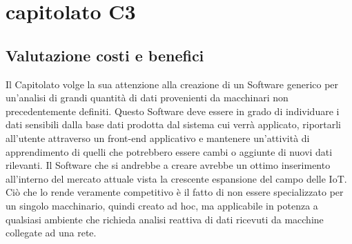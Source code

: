 \section{capitolato C3}

\subsection{Valutazione costi e benefici}
Il Capitolato volge la sua attenzione alla creazione di un Software generico per un'analisi di grandi quantità di dati provenienti da macchinari non precedentemente definiti. Questo Software deve essere in grado di individuare i dati sensibili dalla base dati prodotta dal sistema cui verrà applicato, riportarli all'utente attraverso un front-end applicativo e mantenere un'attività di apprendimento di quelli che potrebbero essere cambi o aggiunte di nuovi dati rilevanti. Il Software che si andrebbe a creare avrebbe un ottimo inserimento all'interno del mercato attuale vista la crescente espansione del campo delle IoT. Ciò che lo rende veramente competitivo è il fatto di non essere specializzato per un singolo macchinario, quindi creato ad hoc, ma applicabile in potenza a qualsiasi ambiente che richieda analisi reattiva di dati ricevuti da macchine collegate ad una rete.